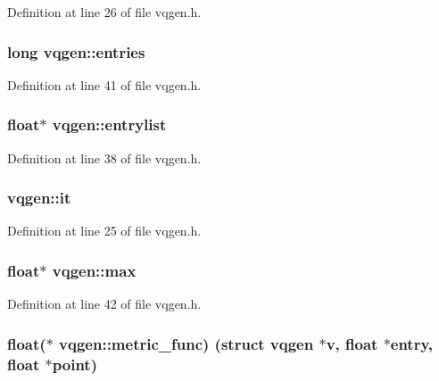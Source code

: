 Definition at line 26 of file vqgen.\+h.

\subsubsection[{\texorpdfstring{entries}{entries}}]{\setlength{\rightskip}{0pt plus 5cm}long vqgen\+::entries}\hypertarget{structvqgen_a1e787843315b3dfd83e0eaa9e5711043}{}\label{structvqgen_a1e787843315b3dfd83e0eaa9e5711043}


Definition at line 41 of file vqgen.\+h.

\subsubsection[{\texorpdfstring{entrylist}{entrylist}}]{\setlength{\rightskip}{0pt plus 5cm}float$\ast$ vqgen\+::entrylist}\hypertarget{structvqgen_a5ee8b3519eb4f79d5a5216f915d5b307}{}\label{structvqgen_a5ee8b3519eb4f79d5a5216f915d5b307}


Definition at line 38 of file vqgen.\+h.

\subsubsection[{\texorpdfstring{it}{it}}]{ vqgen\+::it}\hypertarget{structvqgen_adb814cb412b03818ad038401926a875e}{}\label{structvqgen_adb814cb412b03818ad038401926a875e}


Definition at line 25 of file vqgen.\+h.

\subsubsection[{\texorpdfstring{max}{max}}]{\setlength{\rightskip}{0pt plus 5cm}float$\ast$ vqgen\+::max}\hypertarget{structvqgen_adb896c1640a7b1d447562e7fe153385f}{}\label{structvqgen_adb896c1640a7b1d447562e7fe153385f}


Definition at line 42 of file vqgen.\+h.

\subsubsection[{\texorpdfstring{metric\+\_\+func}{metric_func}}]{\setlength{\rightskip}{0pt plus 5cm}float($\ast$ vqgen\+::metric\+\_\+func) (struct {\bf vqgen} $\ast$v, float $\ast$entry, float $\ast$point)}\hypertarget{structvqgen_a964d95278df9dff2436146915a656122}{}\label{structvqgen_a964d95278df9dff2436146915a656122}


